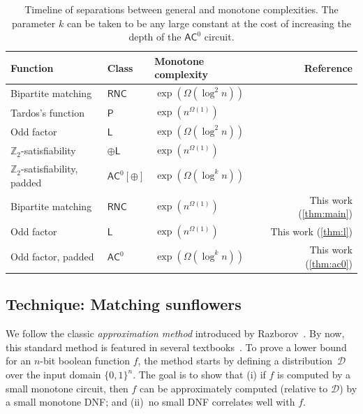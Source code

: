 \documentclass[11pt]{article}
\theoremstyle{plain}
\theoremstyle{definition}
\theoremstyle{remark}
\newcommand{\complexityfont}[1]{\mathsf{#1}}
\def\RNC          {\complexityfont{RNC}}
\def\P            {\complexityfont{P}}
\def\AC           {\complexityfont{AC}}
\def\pL           {\oplus\L}
\renewcommand{\L} {\complexityfont{L}}
\def\cald{{\mathcal D}}
\begin{document}
\begin{table}[t]
\centering
\renewcommand{\arraystretch}{1}
\newcommand{\pad}{\hskip 1.5em}
\setlength\tabcolsep{.2em}
\begin{tabular}{l @{\pad} l @{\pad} l @{\pad} r}
\toprule[.5mm]
\bf Function & \bf Class & \bf Monotone complexity & \bf Reference \\
\midrule
Bipartite matching & $\RNC$ & $\exp(\Omega(\log^2 n))$ & \cite{Razborov1985} \\
Tardos's function & $\P$ & $\exp(n^{\Omega(1)})$ & \cite{Alon1987,Tardos1988} \\
Odd factor & $\L$ & $\exp(\Omega(\log^2 n))$ & \cite{Babai1999} \\
$\mathbb{Z}_2$-satisfiability &  $\pL$ & $\exp(n^{\Omega(1)})$ & \cite{Garg2020,Goos2019} \\
$\mathbb{Z}_2$-satisfiability, padded & $\AC^0[\oplus]$ & $\exp(\Omega(\log^k n))$ & \cite{Cavalar2023} \\
\midrule
Bipartite matching & $\RNC$ & $\exp(n^{\Omega(1)})$ & This work (\cref{thm:main}) \\
Odd factor & $\textsf{L}$ & $\exp(n^{\Omega(1)})$ & This work (\cref{thm:l}) \\
Odd factor, padded & $\AC^0$ & $\exp(\Omega(\log^k n))$ & This work (\cref{thm:ac0})\\
\bottomrule[.5mm]
\end{tabular}
\caption{Timeline of separations between general and monotone complexities.
The parameter $k$ can be taken to be any large constant at the cost of
increasing the depth of the $\AC^0$ circuit.}
\label{tab:separations}
\end{table}


\subsection{Technique: Matching sunflowers}
\label{sec:techniques}

We follow the classic \emph{approximation method} introduced by Razborov~\cite{Razborov1985,Razborov1985a}. By now, this standard method is featured in several textbooks~\cite{Wegener1987,Arora2009,Jukna2012,Watson2025}. To prove a lower bound for an $n$-bit boolean function $f$, the method starts by defining a distribution~$\cald$ over the input domain $\{0,1\}^n$. The goal is to show that (i) if $f$ is computed by a small monotone circuit, then $f$ can be approximately computed (relative to $\cald$) by a small monotone DNF; and (ii)~no small DNF correlates well with $f$.
\end{document}
